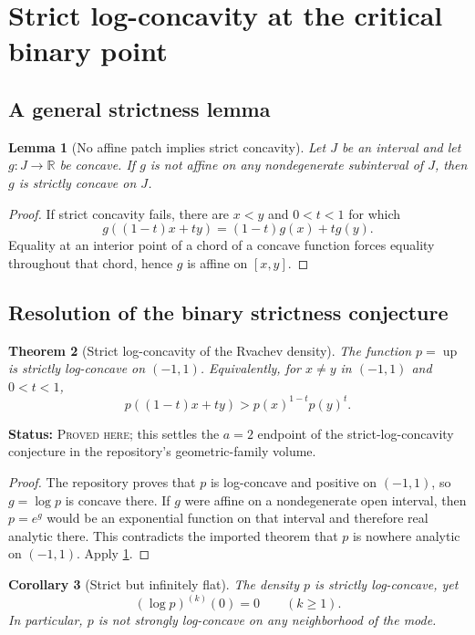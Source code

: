 \documentclass[11pt,oneside]{article}
\newtheorem{theorem}{Theorem}[section]
\newtheorem{lemma}[theorem]{Lemma}
\newtheorem{corollary}[theorem]{Corollary}
\theoremstyle{definition}
\theoremstyle{remark}
\newcommand{\R}{\mathbb R}
\newcommand{\Up}{\operatorname{up}}
\newcommand{\ProvedHere}{\textcolor{statusgreen}{\textsc{Proved here}}}
\newcommand{\Status}[1]{\par\smallskip\noindent\textbf{Status:} #1.\par\smallskip}
\begin{document}
\section{Strict log-concavity at the critical binary point}

\subsection{A general strictness lemma}
\begin{lemma}[No affine patch implies strict concavity]\label{lem:no-affine}
Let $J$ be an interval and let $g:J\to\R$ be concave.  If $g$ is not affine on
any nondegenerate subinterval of $J$, then $g$ is strictly concave on $J$.
\end{lemma}

\begin{proof}
If strict concavity fails, there are $x<y$ and $0<t<1$ for which
\[
 g((1-t)x+ty)=(1-t)g(x)+tg(y).
\]
Equality at an interior point of a chord of a concave function forces equality
throughout that chord, hence $g$ is affine on $[x,y]$.
\end{proof}

\subsection{Resolution of the binary strictness conjecture}
\begin{theorem}[Strict log-concavity of the Rvachev density]\label{thm:strict-logconcave}
The function $p=\Up$ is strictly log-concave on $(-1,1)$.  Equivalently, for
$x\ne y$ in $(-1,1)$ and $0<t<1$,
\begin{equation}\label{eq:strict-logconcave}
 p((1-t)x+ty)>p(x)^{1-t}p(y)^t.
\end{equation}
\end{theorem}
\Status{\ProvedHere; this settles the $a=2$ endpoint of the strict-log-concavity
conjecture in the repository's geometric-family volume}

\begin{proof}
The repository proves that $p$ is log-concave and positive on $(-1,1)$, so
$g=\log p$ is concave there.  If $g$ were affine on a nondegenerate open interval,
then $p=e^g$ would be an exponential function on that interval and therefore real
analytic there.  This contradicts the imported theorem that $p$ is nowhere
analytic on $(-1,1)$.  Apply \cref{lem:no-affine}.
\end{proof}

\begin{corollary}[Strict but infinitely flat]\label{cor:flat-strict}
The density $p$ is strictly log-concave, yet
\begin{equation}
 (\log p)^{(k)}(0)=0\qquad(k\ge1).
\end{equation}
In particular, $p$ is not strongly log-concave on any neighborhood of the mode.
\end{corollary}
\end{document}
